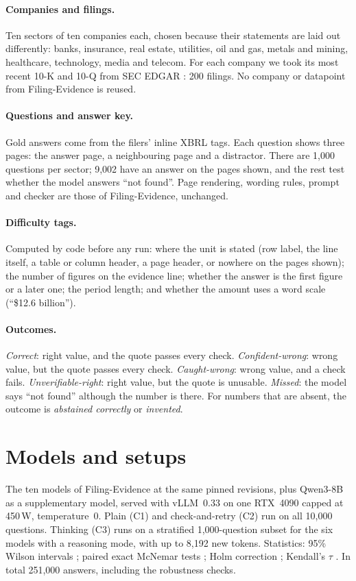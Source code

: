 \documentclass[11pt]{article}
\begin{document}
\paragraph{Companies and filings.} Ten sectors of ten companies each, chosen because their statements are laid out differently: banks, insurance, real estate, utilities, oil and gas, metals and mining, healthcare, technology, media and telecom. For each company we took its most recent 10-K and 10-Q from SEC EDGAR \citep{sec_edgar}: 200 filings. No company or datapoint from Filing-Evidence is reused.
\paragraph{Questions and answer key.} Gold answers come from the filers' inline XBRL tags. Each question shows three pages: the answer page, a neighbouring page and a distractor. There are 1,000 questions per sector; 9{,}002 have an answer on the pages shown, and the rest test whether the model answers ``not found''. Page rendering, wording rules, prompt and checker are those of Filing-Evidence, unchanged.
\paragraph{Difficulty tags.} Computed by code before any run: where the unit is stated (row label, the line itself, a table or column header, a page header, or nowhere on the pages shown); the number of figures on the evidence line; whether the answer is the first figure or a later one; the period length; and whether the amount uses a word scale (``\$12.6 billion'').
\paragraph{Outcomes.} \emph{Correct}: right value, and the quote passes every check. \emph{Confident-wrong}: wrong value, but the quote passes every check. \emph{Caught-wrong}: wrong value, and a check fails. \emph{Unverifiable-right}: right value, but the quote is unusable. \emph{Missed}: the model says ``not found'' although the number is there. For numbers that are absent, the outcome is \emph{abstained correctly} or \emph{invented}.

\section{Models and setups}
The ten models of Filing-Evidence at the same pinned revisions, plus Qwen3-8B as a supplementary model, served with vLLM~0.33 \citep{kwon2023vllm} on one RTX~4090 capped at 450\,W, temperature~0. Plain (C1) and check-and-retry (C2) run on all 10{,}000 questions. Thinking (C3) runs on a stratified 1{,}000-question subset for the six models with a reasoning mode, with up to 8{,}192 new tokens. Statistics: 95\% Wilson intervals \citep{wilson1927}; paired exact McNemar tests \citep{mcnemar1947}; Holm correction \citep{holm1979}; Kendall's $\tau$ \citep{kendall1938}. In total 251{,}000 answers, including the robustness checks.
\end{document}
